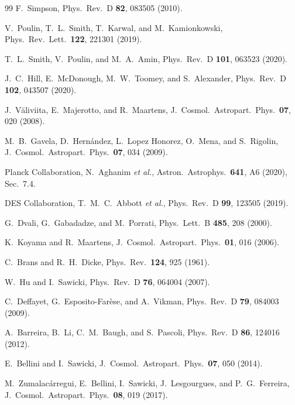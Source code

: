 \begin{thebibliography}{99}
F.~Simpson, Phys.\ Rev.\ D \textbf{82}, 083505 (2010).

V.~Poulin, T.~L.~Smith, T.~Karwal, and M.~Kamionkowski, Phys.\ Rev.\ Lett.\ \textbf{122}, 221301 (2019).

T.~L.~Smith, V.~Poulin, and M.~A.~Amin, Phys.\ Rev.\ D \textbf{101}, 063523 (2020).

J.~C.~Hill, E.~McDonough, M.~W.~Toomey, and S.~Alexander, Phys.\ Rev.\ D \textbf{102}, 043507 (2020).

J.~V\"aliviita, E.~Majerotto, and R.~Maartens, J.\ Cosmol.\ Astropart.\ Phys.\ \textbf{07}, 020 (2008).

M.~B.~Gavela, D.~Hern\'andez, L.~Lopez Honorez, O.~Mena, and S.~Rigolin, J.\ Cosmol.\ Astropart.\ Phys.\ \textbf{07}, 034 (2009).

Planck Collaboration, N.~Aghanim \textit{et al.}, Astron.\ Astrophys.\ \textbf{641}, A6 (2020), Sec.~7.4.

DES Collaboration, T.~M.~C.~Abbott \textit{et al.}, Phys.\ Rev.\ D \textbf{99}, 123505 (2019).

G.~Dvali, G.~Gabadadze, and M.~Porrati, Phys.\ Lett.\ B \textbf{485}, 208 (2000).

K.~Koyama and R.~Maartens, J.\ Cosmol.\ Astropart.\ Phys.\ \textbf{01}, 016 (2006).

C.~Brans and R.~H.~Dicke, Phys.\ Rev.\ \textbf{124}, 925 (1961).

W.~Hu and I.~Sawicki, Phys.\ Rev.\ D \textbf{76}, 064004 (2007).

C.~Deffayet, G.~Esposito-Far\`ese, and A.~Vikman, Phys.\ Rev.\ D \textbf{79}, 084003 (2009).

A.~Barreira, B.~Li, C.~M.~Baugh, and S.~Pascoli, Phys.\ Rev.\ D \textbf{86}, 124016 (2012).

E.~Bellini and I.~Sawicki, J.\ Cosmol.\ Astropart.\ Phys.\ \textbf{07}, 050 (2014).

M.~Zumalac\'arregui, E.~Bellini, I.~Sawicki, J.~Lesgourgues, and P.~G.~Ferreira, J.\ Cosmol.\ Astropart.\ Phys.\ \textbf{08}, 019 (2017).

\end{thebibliography}
